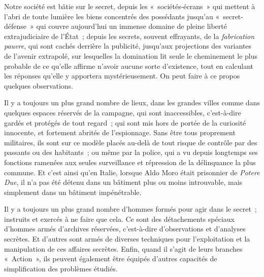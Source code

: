 \documentclass[french,twoside]{book} %
\begin{document}
\noindent Notre société est bâtie sur le secret, depuis les « sociétés-écrans » qui mettent à l’abri de toute lumière les biens concentrés des possédants jusqu’au « secret-défense » qui couvre aujourd’hui un immense domaine de pleine liberté extrajudiciaire de l’État ; depuis les secrets, souvent effrayants, de la \emph{fabrication pauvre}, qui sont cachés derrière la publicité, jusqu’aux projections des variantes de l’avenir extrapolé, sur lesquelles la domination lit seule le cheminement le plus probable de ce qu’elle affirme n’avoir aucune sorte d’existence, tout en calculant les réponses qu’elle y apportera mystérieusement. On peut faire à ce propos quelques observations.\par
Il y a toujours un plus grand nombre de lieux, dans les grandes villes comme dans quelques espaces réservés de la campagne, qui sont inaccessibles, c’est-à-dire gardés et protégés de tout regard ; qui sont mis hors de portée de la curiosité innocente, et fortement abrités de l’espionnage. Sans être tous proprement militaires, ils sont sur ce modèle placés au-delà de tout risque de contrôle par des passants ou des habitants ; ou même par la police, qui a vu depuis longtemps ses fonctions ramenées aux seules surveillance et répression de la délinquance la plus commune. Et c’est ainsi qu’en Italie, lorsque Aldo Moro était prisonnier de \emph{Potere Due}, il n’a pas été détenu dans un bâtiment plus ou moins introuvable, mais simplement dans un bâtiment impénétrable.\par
Il y a toujours un plus grand nombre d’hommes formés pour agir dans le secret ; instruits et exercés à ne faire que cela. Ce sont des détachements spéciaux d’hommes armés d’archives réservées, c’est-à-dire d’observations et d’analyses secrètes. Et d’autres sont armés de diverses techniques pour l’exploitation et la manipulation de ces affaires secrètes. Enfin, quand il s’agit de leurs branches « Action », ils peuvent également être équipés d’autres capacités de simplification des problèmes étudiés.\par
\end{document}
